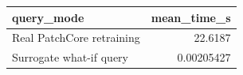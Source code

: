 \begin{tabular}{lr}
\toprule
               query\_mode &  mean\_time\_s \\
\midrule
Real PatchCore retraining &      22.6187 \\
  Surrogate what-if query &   0.00205427 \\
\bottomrule
\end{tabular}
